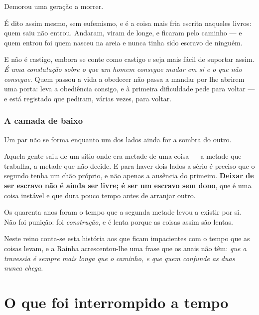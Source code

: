 \documentclass[livro.tex]{subfiles}
\begin{document}
Demorou uma geração a morrer.

\medskip

É dito assim mesmo, sem eufemismo, e é a coisa mais fria escrita naqueles livros: quem saiu não
entrou. Andaram, viram de longe, e ficaram pelo caminho --- e quem entrou foi quem nasceu na
areia e nunca tinha sido escravo de ninguém.

\medskip

E não é castigo, embora se conte como castigo e seja mais fácil de suportar assim. \emph{É uma
constatação sobre o que um homem consegue mudar em si e o que não consegue.} Quem passou a vida a
obedecer não passa a mandar por lhe abrirem uma porta: leva a obediência consigo, e à primeira
dificuldade pede para voltar --- e está registado que pediram, várias vezes, para voltar.

\subsection*{A camada de baixo}

Um par não se forma enquanto um dos lados ainda for a sombra do outro.

\medskip

Aquela gente saiu de um sítio onde era metade de uma coisa --- a metade que trabalha, a metade que
não decide. E para haver dois lados a sério é preciso que o segundo tenha um chão próprio, e não
apenas a ausência do primeiro. \textbf{Deixar de ser escravo não é ainda ser livre; é ser um
escravo sem dono}, que é uma coisa instável e que dura pouco tempo antes de arranjar outro.

\medskip

Os quarenta anos foram o tempo que a segunda metade levou a existir por si. Não foi punição: foi
\emph{construção}, e é lenta porque as coisas assim são lentas.

\medskip

Neste reino conta-se esta história aos que ficam impacientes com o tempo que as coisas levam, e a
Rainha acrescentou-lhe uma frase que os anais não têm: \emph{que a travessia é sempre mais longa
que o caminho, e que quem confunde as duas nunca chega.}


\chapter{O que foi interrompido a tempo}
\end{document}
